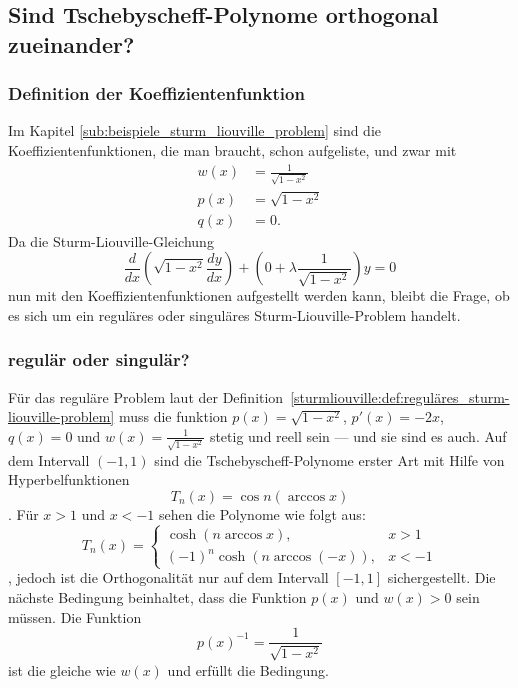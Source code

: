%
%
%

\subsection{Sind Tschebyscheff-Polynome orthogonal zueinander?
\label{sturmliouville:sub:tschebyscheff-polynome}}
\subsubsection*{Definition der Koeffizientenfunktion}
Im Kapitel \ref{sub:beispiele_sturm_liouville_problem} sind die
Koeffizientenfunktionen, die man braucht, schon aufgeliste, und zwar mit
\begin{align*}
	w(x) &= \frac{1}{\sqrt{1-x^2}} \\
	p(x) &= \sqrt{1-x^2} \\
	q(x) &= 0.
\end{align*}
Da die Sturm-Liouville-Gleichung
\begin{equation}
	\label{eq:sturm-liouville-equation-tscheby}
	\frac{d}{dx} (\sqrt{1-x^2} \frac{dy}{dx}) +
	(0 + \lambda \frac{1}{\sqrt{1-x^2}}) y
	=
	0 
\end{equation}
nun mit den Koeffizientenfunktionen aufgestellt werden kann, bleibt die Frage,
ob es sich um ein reguläres oder singuläres Sturm-Liouville-Problem handelt.

\subsubsection*{regulär oder singulär?}
Für das reguläre Problem laut der
Definition~\ref{sturmliouville:def:reguläres_sturm-liouville-problem} muss die funktion
$p(x) = \sqrt{1-x^2}$, $p'(x) = -2x$, $q(x) = 0$ und
$w(x) = \frac{1}{\sqrt{1-x^2}}$ stetig und reell sein --- und sie sind es auch.
Auf dem Intervall $(-1,1)$ sind die Tschebyscheff-Polynome erster Art mit Hilfe
von Hyperbelfunktionen
\begin{equation}
	T_n(x)
	=
	\cos n (\arccos x)
\end{equation}.
Für $x>1$ und $x<-1$ sehen die Polynome wie folgt aus:
\begin{equation}
	T_n(x) = \left\{\begin{array}{ll} \cosh (n \arccos x), & x > 1\\
		(-1)^n \cosh (n \arccos (-x)), & x<-1 \end{array}\right.
\end{equation},
jedoch ist die Orthogonalität nur auf dem Intervall $[ -1, 1]$ sichergestellt.
Die nächste Bedingung beinhaltet, dass die Funktion $p(x)$ und $w(x)>0$ sein
müssen.
Die Funktion
\begin{equation*}
	p(x)^{-1} = \frac{1}{\sqrt{1-x^2}}
\end{equation*}
ist die gleiche wie $w(x)$ und erfüllt die Bedingung.

